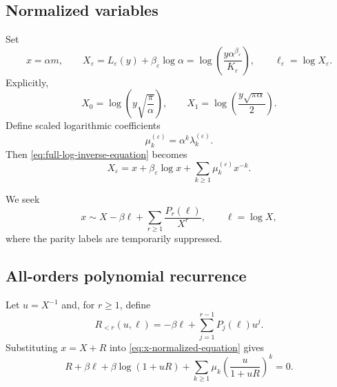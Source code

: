 \documentclass[11pt,a4paper]{article}
\theoremstyle{clean}
\theoremstyle{definition}
\newcommand{\eps}{\varepsilon}
\newcommand{\al}{\alpha}
\newcommand{\be}{\beta}
\begin{document}
\subsection{Normalized variables}

Set
\begin{equation}
 x=\al m,
 \qquad
 X_\eps=L_\eps(y)+\be_\eps\log\al
 =\log\!\left(\frac{y\al^{\be_\eps}}{K_\eps}\right),
 \qquad
 \ell_\eps=\log X_\eps.
 \label{eq:X-def}
\end{equation}
Explicitly,
\begin{equation}
 X_0=\log\!\left(y\sqrt{\frac{\pi}{\al}}\right),
 \qquad
 X_1=\log\!\left(\frac{y\sqrt{\pi\al}}{2}\right).
 \label{eq:X-explicit}
\end{equation}
Define scaled logarithmic coefficients
\begin{equation}
 \mu_k^{(\eps)}=\al^k\lambda_k^{(\eps)}.
 \label{eq:mu-def}
\end{equation}
Then \cref{eq:full-log-inverse-equation} becomes
\begin{equation}
 X_\eps=x+\be_\eps\log x+
 \sum_{k\ge1}\mu_k^{(\eps)}x^{-k}.
 \label{eq:x-normalized-equation}
\end{equation}

We seek
\begin{equation}
 x\sim X-\be\ell+\sum_{r\ge1}\frac{P_r(\ell)}{X^r},
 \qquad \ell=\log X,
 \label{eq:P-ansatz}
\end{equation}
where the parity labels are temporarily suppressed.

\subsection{All-orders polynomial recurrence}

Let \(u=X^{-1}\) and, for \(r\ge1\), define
\begin{equation}
 R_{<r}(u,\ell)=-\be\ell+
 \sum_{j=1}^{r-1}P_j(\ell)u^j.
 \label{eq:R-polylog}
\end{equation}
Substituting \(x=X+R\) into \cref{eq:x-normalized-equation} gives
\begin{equation}
 R+\be\ell+
 \be\log(1+uR)+
 \sum_{k\ge1}\mu_k\left(\frac{u}{1+uR}\right)^k=0.
 \label{eq:R-polylog-equation}
\end{equation}
\end{document}
